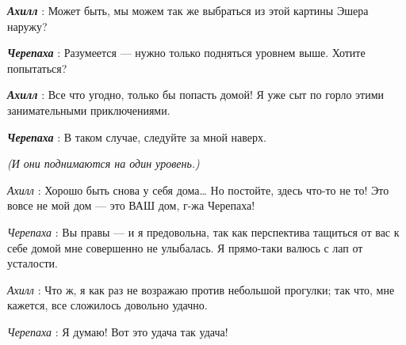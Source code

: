 \emph{\textbf{Ахилл}} : Может быть, мы можем так же выбраться из этой картины Эшера наружу?

\emph{\textbf{Черепаха}} : Разумеется --- нужно только подняться уровнем выше. Хотите попытаться?

\emph{\textbf{Ахилл}} : Все что угодно, только бы попасть домой! Я уже сыт по горло этими занимательными приключениями.

\emph{\textbf{Черепаха}} : В таком случае, следуйте за мной наверх.

\emph{(И они поднимаются на один уровень.)}

\emph{Ахилл} : Хорошо быть снова у себя дома\ldots{} Но постойте, здесь что-то не то! Это вовсе не мой дом --- это ВАШ дом, г-жа Черепаха!

\emph{Черепаха} : Вы правы --- и я предовольна, так как перспектива тащиться от вас к себе домой мне совершенно не улыбалась. Я прямо-таки валюсь с лап от усталости.

\emph{Ахилл} : Что ж, я как раз не возражаю против небольшой прогулки; так что, мне кажется, все сложилось довольно удачно.

\emph{Черепаха} : Я думаю! Вот это удача так удача!

